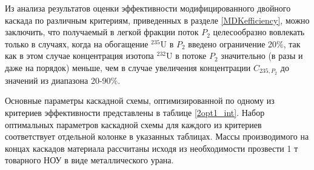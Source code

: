Из анализа результатов оценки эффективности модифицированного двойного каскада по различным критериям, приведенных в разделе \ref{MDKefficiency}, можно заключить, что получаемый в легкой фракции поток $P_2$ целесообразно вовлекать только в случаях, когда на обогащение $^{235}$U в $P_2$ введено ограничение 20\%, так как в этом случае концентрация изотопа $^{232}$U в потоке $P_2$ значительно (в разы и даже на порядок) меньше, чем в случае увеличения концентрации $C_{235,{P_2}}$ до значений из диапазона 20-90\%.

Основные параметры каскадной схемы, оптимизированной по одному из критериев эффективности представлены в таблице \ref{2opt1_int}.
Набор оптимальных параметров каскадной схемы для каждого из критериев соответствует отдельной колонке в указанных таблицах. 
Массы производимого на концах каскадов материала рассчитаны исходя из необходимости прозвести 1 т товарного НОУ в виде металлического урана.

